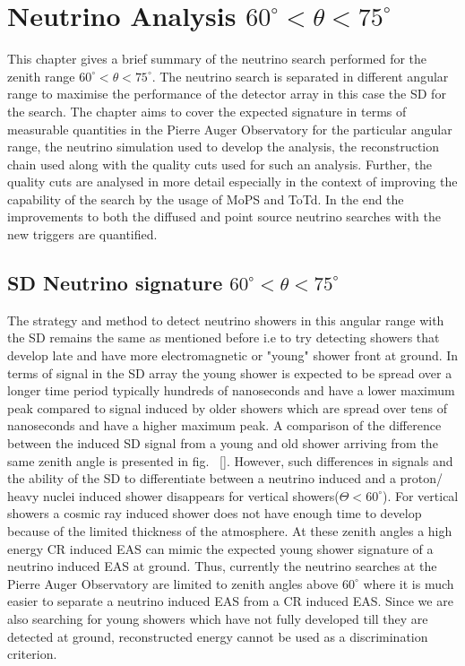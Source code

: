 
\chapter{Neutrino Analysis $60^\circ < \theta < 75^\circ$}
\label{sec:DGL}
This chapter gives a brief summary of the neutrino search performed for the zenith range $60^\circ < \theta < 75^\circ$. The neutrino search is separated in different angular range to maximise the performance of the detector array in this case the SD for the search. The chapter aims to cover the expected signature in terms of measurable quantities in the Pierre Auger Observatory for the particular angular range, the neutrino simulation used to develop the analysis, the reconstruction chain used along with the quality cuts used for such an analysis. Further, the quality cuts are analysed in more detail especially in the context of improving the capability of the search by the usage of MoPS and ToTd. In the end the improvements to both the diffused and point source neutrino searches with the new triggers are quantified.


\section{SD Neutrino signature $60^{\circ} < \theta < 75^{\circ}$}
\label{sec:sig_DGL}

The strategy and method to detect neutrino showers in this angular range with the SD remains the same as mentioned before i.e to try detecting showers that develop late and have more electromagnetic or "young" shower front at ground. In terms of signal in the SD array the young shower is expected to be spread over a longer time period typically hundreds of nanoseconds and have a lower maximum peak compared to signal induced by older showers which are spread over tens of nanoseconds and have a higher maximum peak. A comparison of the difference between the induced SD signal from a young and old shower arriving from the same zenith angle is presented in fig. ~\ref{}. However, such differences in signals and the ability of the SD to differentiate between a neutrino induced and a proton/ heavy nuclei induced shower disappears for vertical showers($\Theta < 60^{\circ}$). For vertical showers a cosmic ray induced shower does not have enough time to develop because of the limited thickness of the atmosphere. At these zenith angles a high energy CR induced EAS can mimic the expected young shower signature of a neutrino induced EAS at ground. Thus, currently the neutrino searches at the Pierre Auger Observatory are limited to zenith angles above $60^\circ$ where it is much easier to separate a neutrino induced EAS from a CR induced EAS. Since we are also searching for young showers which have not fully developed till they are detected at ground, reconstructed energy cannot be used as a discrimination criterion.      

